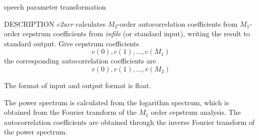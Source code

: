 % 
% 
% 
% 
%                                                                        
%
%
{speech parameter transformation}

\begin{synopsis}
\item[c2acr] [ --m $M_1$ ] [ --M $M_2$ ] [ --l $L$ ] [ {\em infile} ]
\end{synopsis}

\begin{qsection}{DESCRIPTION}
{\em c2acr} calculates $M_2$-order autocorrelation coefficients 
from $M_1$-order cepstrum coefficients from {\em infile} (or standard input), 
writing the result to standard output.
Give cepstrum coefficients
\begin{displaymath}
c(0), c(1), \ldots, c(M_1)
\end{displaymath}
the corresponding autocorrelation coefficients are
\begin{displaymath}
r(0), r(1), \ldots, r(M_2)
\end{displaymath}

The format of input and output format is float.

The power spectrum is calculated from the logarithm spectrum,
which is obtained from the Fourier transform of the $M_1$
order cepstrum analysis.
The autocorrelation coefficients are obtained through the inverse
Fourier transform of the power spectrum.
\end{qsection}

